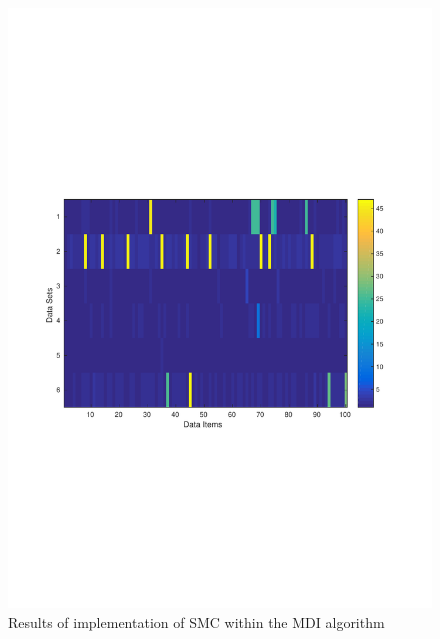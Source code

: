 \documentclass[10pt,a4paper,twoside]{article}
\begin{document}
\begin{figure}
\includegraphics[width=\linewidth]{Plots/mdi_smc_allocations.pdf}
\caption{Results of implementation of SMC within the MDI algorithm}
\label{fig:alloc}
\end{figure}




\end{document}
